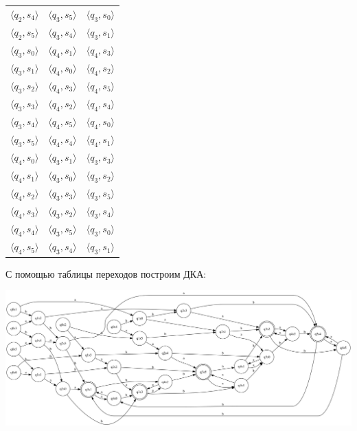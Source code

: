 \documentclass[a4paper,12pt]{article}
\begin{document}
\begin{center}
\begin{tabular}{ |c|c|c| }
 $\langle q_2 , s_4 \rangle$ & $\langle q_3 , s_5 \rangle$ & $\langle q_3 , s_0 \rangle$ \\
 $\langle q_2 , s_5 \rangle$ & $\langle q_3 , s_4 \rangle$ & $\langle q_3 , s_1 \rangle$ \\ 
 $\langle q_3 , s_0 \rangle$ & $\langle q_4 , s_1 \rangle$ & $\langle q_4 , s_3 \rangle$ \\ 
 $\langle q_3 , s_1 \rangle$ & $\langle q_4 , s_0 \rangle$ & $\langle q_4 , s_2 \rangle$ \\
 $\langle q_3 , s_2 \rangle$ & $\langle q_4 , s_3 \rangle$ & $\langle q_4 , s_5 \rangle$ \\ 
 $\langle q_3 , s_3 \rangle$ & $\langle q_4 , s_2 \rangle$ & $\langle q_4 , s_4 \rangle$ \\
 $\langle q_3 , s_4 \rangle$ & $\langle q_4 , s_5 \rangle$ & $\langle q_4 , s_0 \rangle$ \\
 $\langle q_3 , s_5 \rangle$ & $\langle q_4 , s_4 \rangle$ & $\langle q_4 , s_1 \rangle$ \\ 
 $\langle q_4 , s_0 \rangle$ & $\langle q_3 , s_1 \rangle$ & $\langle q_3 , s_3 \rangle$ \\ 
 $\langle q_4 , s_1 \rangle$ & $\langle q_3 , s_0 \rangle$ & $\langle q_3 , s_2 \rangle$ \\
 $\langle q_4 , s_2 \rangle$ & $\langle q_3 , s_3 \rangle$ & $\langle q_3 , s_5 \rangle$ \\ 
 $\langle q_4 , s_3 \rangle$ & $\langle q_3 , s_2 \rangle$ & $\langle q_3 , s_4 \rangle$ \\
 $\langle q_4 , s_4 \rangle$ & $\langle q_3 , s_5 \rangle$ & $\langle q_3 , s_0 \rangle$ \\
 $\langle q_4 , s_5 \rangle$ & $\langle q_3 , s_4 \rangle$ & $\langle q_3 , s_1 \rangle$ \\ 
 \hline
\end{tabular}
\end{center}
С помощью таблицы переходов построим ДКА:
\begin{center}
\includegraphics[width=1.15\textwidth]{2_5}\newline
\end{center}
\end{document}
